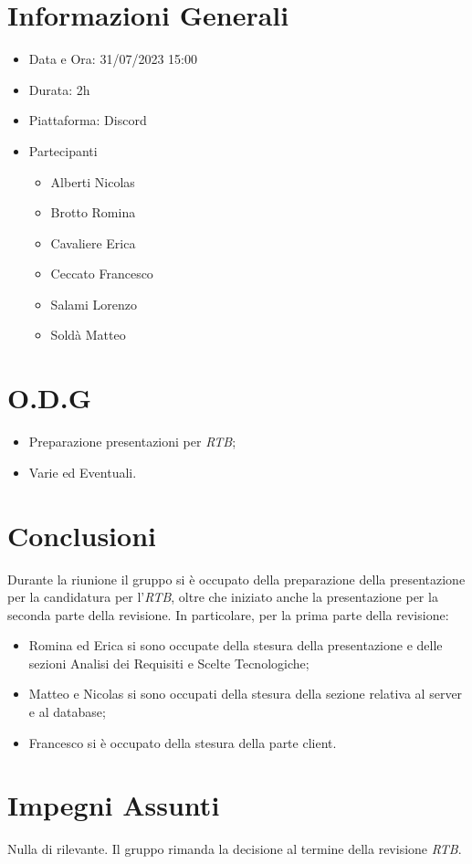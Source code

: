 \documentclass[a4paper, 12pt]{article}
\begin{document}
\makefrontpage

\section*{Informazioni Generali}
\begin{itemize}
    \item Data e Ora: 31/07/2023 15:00
    \item Durata: 2h
    \item Piattaforma: Discord
    \item Partecipanti
    \begin{itemize}
        \item Alberti Nicolas
        \item Brotto Romina
        \item Cavaliere Erica
        \item Ceccato Francesco
        \item Salami Lorenzo
        \item Soldà Matteo
    \end{itemize}
\end{itemize}

\section*{O.D.G}
\begin{itemize}
    \item Preparazione presentazioni per \textit{RTB};
    \item Varie ed Eventuali.
\end{itemize}

\section*{Conclusioni}
Durante la riunione il gruppo si è occupato della preparazione della presentazione per la candidatura per l'\textit{RTB}, oltre che iniziato anche la presentazione per la seconda parte della revisione.
In particolare, per la prima parte della revisione:
\begin{itemize}
    \item Romina ed Erica si sono occupate della stesura della presentazione e delle sezioni Analisi dei Requisiti e Scelte Tecnologiche;
    \item Matteo e Nicolas si sono occupati della stesura della sezione relativa al server e al database;
    \item Francesco si è occupato della stesura della parte client.
\end{itemize}

\section*{Impegni Assunti}
Nulla di rilevante. Il gruppo rimanda la decisione al termine della revisione \textit{RTB}.
\end{document}
